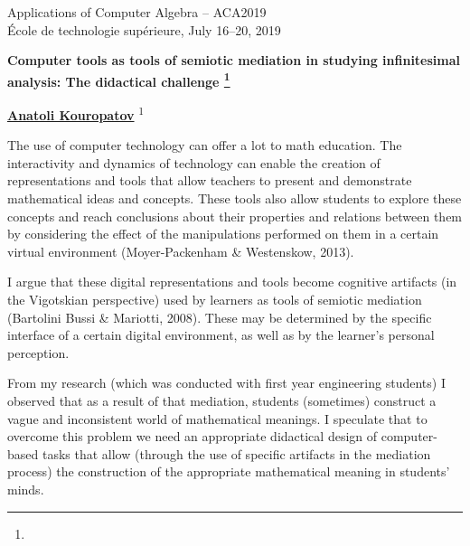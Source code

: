 \documentclass{article}
\makeatletter
\newcommand{\TITLE}[2][]{
  \begin{center} \Large \bfseries #2%
  \def\@temp{#1}\ifx\@temp\@empty\relax\else\footnote{#1}\fi\end{center}}
\newcommand{\AUTHOR}[2][]{\textbf{#2}%
  \def\@temp{#1}\ifx\@temp\@empty\relax\else\textsuperscript{#1}\fi}
\newcommand{\HEADING}{
{\noindent \small Applications of Computer Algebra -- ACA2019 \\
\'Ecole de technologie sup\'erieure, July 16--20, 2019} \vspace{10pt}}
\makeatother
\begin{document}
\HEADING


\TITLE{Computer tools as tools of semiotic mediation in studying infinitesimal analysis: The didactical challenge}



\begin{center}
 \AUTHOR[1]{\underline{Anatoli Kouropatov}} %
\end{center}



The use of computer technology can offer a lot to math education. The
interactivity and dynamics of technology can enable the creation of
representations and tools that allow teachers to present and demonstrate
mathematical ideas and concepts. These tools also allow students to
explore these concepts and reach conclusions about their properties and
relations between them by considering the effect of the manipulations
performed on them in a certain virtual environment (Moyer-Packenham \&
Westenskow, 2013).

I argue that these digital representations and tools become cognitive
artifacts (in the Vigotskian perspective) used by learners as tools
of semiotic mediation (Bartolini Bussi \& Mariotti, 2008). These may be
determined by the specific interface of a certain digital environment,
as well as by the learner’s personal perception.

From my research (which was conducted with first year engineering
students) I observed that as a result of that mediation, students
(sometimes) construct a vague and inconsistent world of mathematical
meanings. I speculate that to overcome this problem we need an appropriate
didactical design of computer-based tasks that allow (through the use
of specific artifacts in the mediation process) the construction of the
appropriate mathematical meaning in students' minds.
\end{document}
